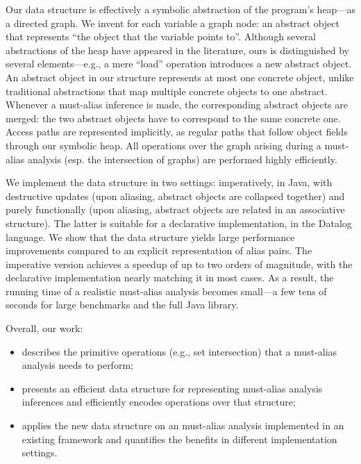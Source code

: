 Our data structure is effectively a symbolic abstraction of the
program's heap---as a directed graph. We invent for each variable a
graph node: an abstract object that represents ``the object that the
variable points to''.  Although several abstractions of the heap have
appeared in the literature, ours is distinguished by several
elements---e.g., a mere ``load'' operation introduces a new abstract
object. An abstract object in our structure represents at most one
concrete object, unlike traditional abstractions that map multiple
concrete objects to one abstract. Whenever a must-alias inference is
made, the corresponding abstract objects are merged: the two abstract
objects have to correspond to the same concrete one. Access paths are
represented implicitly, as regular paths that follow object fields
through our symbolic heap. All operations over the graph arising
during a must-alias analysis (esp. the intersection of graphs) are
performed highly efficiently.

We implement the data structure in two settings: imperatively, in Java, with
destructive updates (upon aliasing, abstract objects are collapsed together)
and purely functionally (upon aliasing, abstract objects are related in an
associative structure). The latter is suitable for a declarative
implementation, in the Datalog language.  We show that the data structure
yields large performance improvements compared to an explicit representation of
alias pairs. The imperative version achieves a speedup of up to two orders of
magnitude, with the declarative implementation nearly matching it in most
cases.  As a result, the running time of a realistic must-alias analysis
becomes small---a few tens of seconds for large benchmarks and the full Java
library.

Overall, our work:

\begin{itemize}
\item describes the primitive operations (e.g., set intersection) that a
	must-alias analysis needs to perform;
\item presents an efficient data structure for representing must-alias analysis
	inferences and efficiently encodes operations over that structure;
\item applies the new data structure on an must-alias analysis implemented in
	an existing framework and quantifies the benefits in different
	implementation settings.
\end{itemize}




